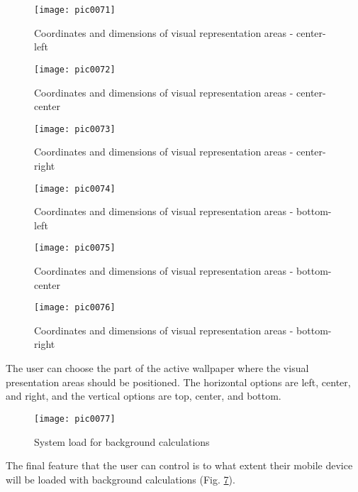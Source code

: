 \begin{figure}[h]
\centering
\texttt{[image: pic0071]}
\caption{Coordinates and dimensions of visual representation areas - center-left}
\label{fig:pic0071}
\end{figure}
\FloatBarrier

\begin{figure}[h]
\centering
\texttt{[image: pic0072]}
\caption{Coordinates and dimensions of visual representation areas - center-center}
\label{fig:pic0072}
\end{figure}
\FloatBarrier

\begin{figure}[h]
\centering
\texttt{[image: pic0073]}
\caption{Coordinates and dimensions of visual representation areas - center-right}
\label{fig:pic0073}
\end{figure}
\FloatBarrier

\begin{figure}[h]
\centering
\texttt{[image: pic0074]}
\caption{Coordinates and dimensions of visual representation areas - bottom-left}
\label{fig:pic0074}
\end{figure}
\FloatBarrier

\begin{figure}[h]
\centering
\texttt{[image: pic0075]}
\caption{Coordinates and dimensions of visual representation areas - bottom-center}
\label{fig:pic0075}
\end{figure}
\FloatBarrier

\begin{figure}[h]
\centering
\texttt{[image: pic0076]}
\caption{Coordinates and dimensions of visual representation areas - bottom-right}
\label{fig:pic0076}
\end{figure}
\FloatBarrier

The user can choose the part of the active wallpaper where the visual presentation areas should be positioned. The horizontal options are left, center, and right, and the vertical options are top, center, and bottom.

\begin{figure}[h]
\centering
\texttt{[image: pic0077]}
\caption{System load for background calculations}
\label{fig:pic0077}
\end{figure}
\FloatBarrier

The final feature that the user can control is to what extent their mobile device will be loaded with background calculations (Fig. \ref{fig:pic0077}).

